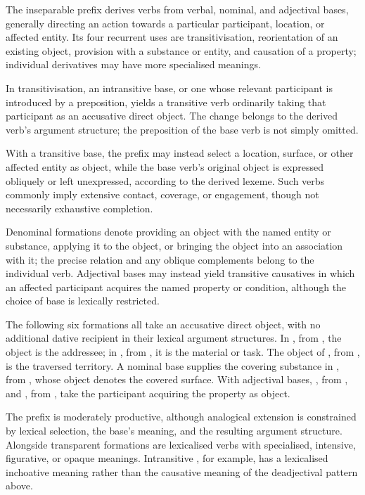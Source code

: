 The inseparable prefix  derives verbs from verbal, nominal, and adjectival bases, generally directing an action towards a particular participant, location, or affected entity. Its four recurrent uses are transitivisation, reorientation of an existing object, provision with a substance or entity, and causation of a property; individual derivatives may have more specialised meanings.

In transitivisation, an intransitive base, or one whose relevant participant is introduced by a preposition, yields a transitive verb ordinarily taking that participant as an accusative direct object. The change belongs to the derived verb's argument structure; the preposition of the base verb is not simply omitted.

With a transitive base, the prefix may instead select a location, surface, or other affected entity as object, while the base verb's original object is expressed obliquely or left unexpressed, according to the derived lexeme. Such verbs commonly imply extensive contact, coverage, or engagement, though not necessarily exhaustive completion.

Denominal formations denote providing an object with the named entity or substance, applying it to the object, or bringing the object into an association with it; the precise relation and any oblique complements belong to the individual verb. Adjectival bases may instead yield transitive causatives in which an affected participant acquires the named property or condition, although the choice of base is lexically restricted.

The following six formations all take an accusative direct object, with no additional dative recipient in their lexical argument structures. In , from , the object is the addressee; in , from , it is the material or task. The object of , from , is the traversed territory. A nominal base supplies the covering substance in , from , whose object denotes the covered surface. With adjectival bases, , from , and , from , take the participant acquiring the property as object.

The prefix is moderately productive, although analogical extension is constrained by lexical selection, the base's meaning, and the resulting argument structure. Alongside transparent formations are lexicalised verbs with specialised, intensive, figurative, or opaque meanings. Intransitive , for example, has a lexicalised inchoative meaning rather than the causative meaning of the deadjectival pattern above.

